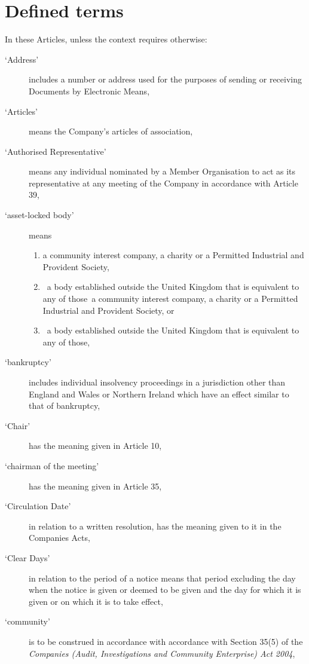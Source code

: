 \documentclass[a4paper,12pt]{article}
\renewcommand{\labelenumi}{\thesection.\arabic{enumi}}
\begin{document}
\section{Defined terms}

In these Articles, unless the context requires otherwise:

\begin{description}
  \item[`Address'] includes a number or address used for the purposes of sending or receiving Documents by Electronic Means,
  \item[`Articles'] means the Company's articles of association,
  \item[`Authorised Representative'] means any individual nominated by a Member Organisation to act as its representative at any meeting of the Company in accordance with Article 39,
  \item[`asset-locked body'] means
  \begin{enumerate}
    \renewcommand{\labelenumi}{(\alph{enumi})}
    \item a community interest company, a charity or a Permitted Industrial and Provident Society,
    \item a body established outside the United Kingdom that is equivalent to any of those a community interest company, a charity or a Permitted Industrial and Provident Society, or
    \item a body established outside the United Kingdom that is equivalent to any of those,
  \end{enumerate}
  \item[`bankruptcy'] includes individual insolvency proceedings in a jurisdiction other than England and Wales or Northern Ireland which have an effect similar to that of bankruptcy,
  \item[`Chair'] has the meaning given in Article 10,
  \item[`chairman of the meeting'] has the meaning given in Article 35,
  \item[`Circulation Date'] in relation to a written resolution, has the meaning given to it in the Companies Acts,
  \item[`Clear Days'] in relation to the period of a notice means that period excluding the day when the notice is given or deemed to be given and the day for which it is given or on which it is to take effect,
  \item[`community'] is to be construed in accordance with accordance with Section 35(5) of the \textit{Companies (Audit, Investigations and Community Enterprise) Act 2004},

\end{description}
\end{document}
